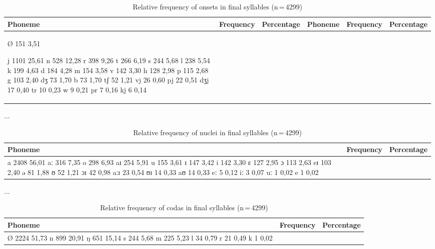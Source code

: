 \begin{table}[hp]\centering
\caption[Relative frequency of onsets in final syllables]{Relative frequency of onsets in final syllables (n\,=\,4299)}
\begin{tabu} to \textwidth{X X[c] X[c] X X[c] X[c]}
\tableheaderfont\toprule
Phoneme
	& Frequency
	& Percentage
	& Phoneme
	& Frequency
	& Percentage
	\\
	
\toprule

Ø	151	3,51%


j	1101	25,61%
n	528	12,28%
r	398	9,26%
t	266	6,19%
s	244	5,68%
l	238	5,54%
k	199	4,63%
d	184	4,28%
m	154	3,58%
v	142	3,30%
h	128	2,98%
p	115	2,68%
g	103	2,40%
dʒ	73	1,70%
b	73	1,70%
tʃ	52	1,21%
vj	26	0,60%
pj	22	0,51%
dʒj	17	0,40%
tr	10	0,23%
w	9	0,21%
pr	7	0,16%
kj	6	0,14%

\bottomrule
\end{tabu}
\label{tab:finon}
\end{table}

...

\begin{table}[hp]\centering
\caption[Relative frequency of nuclei in final syllables]{Relative frequency of nuclei in final syllables (n\,=\,4299)}
\begin{tabu} to 0.5\textwidth{X X[c] X[c]}
\tableheaderfont\toprule
Phoneme
	& Frequency
	& Percentage
	\\
	
\toprule

a	2408	56,01%
aː	316	7,35%
o	298	6,93%
aɪ	254	5,91%
u	155	3,61%
ɪ	147	3,42%
i	142	3,30%
ɛ	127	2,95%
ɔ	113	2,63%
eɪ	103	2,40%
ə	81	1,88%
ʊ	52	1,21%
ɔɪ	42	0,98%
aːɪ	23	0,54%
ʊɪ	14	0,33%
aʊ	14	0,33%
eː	5	0,12%
iː	3	0,07%
uː	1	0,02%
e	1	0,02%

\bottomrule
\end{tabu}
\label{tab:finnuc}
\end{table}

...

\begin{table}[hp]\centering
\caption[Relative frequency of codas in final syllables]{Relative frequency of codas in final syllables (n\,=\,4299)}
\begin{tabu} to 0.5\textwidth{X X[c] X[c]}
\tableheaderfont\toprule
Phoneme
	& Frequency
	& Percentage
	\\
	
\toprule

Ø	2224	51,73%
n	899	20,91%
ŋ	651	15,14%
s	244	5,68%
m	225	5,23%
l	34	0,79%
r	21	0,49%
k	1	0,02%

\bottomrule
\end{tabu}
\label{tab:fincod}
\end{table}

